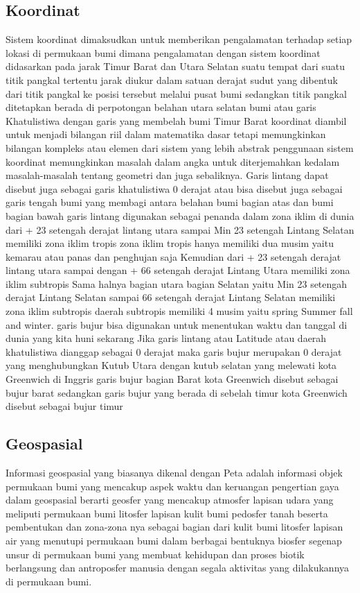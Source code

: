 \subsection{Koordinat}
	Sistem koordinat dimaksudkan untuk memberikan pengalamatan terhadap setiap lokasi di permukaan bumi dimana pengalamatan dengan sistem koordinat didasarkan pada jarak Timur Barat dan Utara Selatan suatu tempat dari suatu titik pangkal tertentu jarak diukur dalam satuan derajat sudut yang dibentuk dari titik pangkal ke posisi tersebut melalui pusat bumi sedangkan titik pangkal ditetapkan berada di perpotongan belahan utara selatan bumi atau garis Khatulistiwa dengan garis yang membelah bumi Timur Barat koordinat diambil untuk menjadi bilangan riil dalam matematika dasar tetapi memungkinkan bilangan kompleks atau elemen dari sistem yang lebih abstrak penggunaan sistem koordinat memungkinkan masalah dalam angka untuk diterjemahkan kedalam masalah-masalah tentang geometri dan juga sebaliknya.
	Garis lintang dapat disebut juga sebagai garis khatulistiwa 0 derajat atau bisa disebut juga sebagai garis tengah bumi yang membagi antara belahan bumi bagian atas dan bumi bagian bawah garis lintang digunakan sebagai penanda dalam zona iklim di dunia dari + 23 setengah derajat lintang utara sampai Min 23 setengah Lintang Selatan memiliki zona iklim tropis zona iklim tropis hanya memiliki dua musim yaitu kemarau atau panas dan penghujan saja Kemudian dari + 23 setengah derajat lintang utara sampai dengan + 66 setengah derajat Lintang Utara memiliki zona iklim subtropis Sama halnya bagian utara bagian Selatan yaitu Min 23 setengah derajat Lintang Selatan sampai 66 setengah derajat Lintang Selatan memiliki zona iklim subtropis daerah subtropis memiliki 4 musim yaitu spring Summer fall and winter. garis bujur bisa digunakan untuk menentukan waktu dan tanggal di dunia yang kita huni sekarang Jika garis lintang atau Latitude atau daerah khatulistiwa dianggap sebagai 0 derajat maka garis bujur merupakan 0 derajat yang menghubungkan Kutub Utara dengan kutub selatan yang melewati kota Greenwich di Inggris garis bujur bagian Barat kota Greenwich disebut sebagai bujur barat sedangkan garis bujur yang berada di sebelah timur kota Greenwich disebut sebagai bujur timur

\subsection{Geospasial}
	Informasi geospasial yang biasanya dikenal dengan Peta adalah informasi objek permukaan bumi yang mencakup aspek waktu dan keruangan pengertian gaya dalam geospasial berarti geosfer yang mencakup atmosfer lapisan udara yang meliputi permukaan bumi litosfer lapisan kulit bumi pedosfer tanah beserta pembentukan dan zona-zona nya sebagai bagian dari kulit bumi litosfer lapisan air yang menutupi permukaan bumi dalam berbagai bentuknya biosfer segenap unsur di permukaan bumi yang membuat kehidupan dan proses biotik berlangsung dan antroposfer manusia dengan segala aktivitas yang dilakukannya di permukaan bumi.


